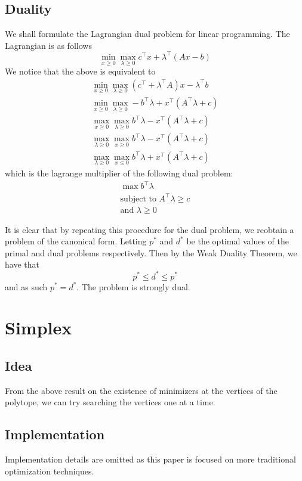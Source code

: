 \documentclass[letterpaper,twocolumn,12pt]{article}
\begin{document}
\subsection{Duality}
We shall formulate the Lagrangian dual problem for linear programming. The Lagrangian is
as follows
$$\min_{x\geq 0}\max_{\lambda\geq 0} c^\intercal x+\lambda^\intercal(Ax-b)$$
We notice that the above is equivalent to
\begin{align*}
  \min_{x\geq 0}\max_{\lambda\geq 0} (c^\intercal+\lambda^\intercal A)x-\lambda^\intercal b\\
  \min_{x\geq 0}\max_{\lambda\geq 0} -b^\intercal\lambda+x^\intercal(A^\intercal\lambda+c)\\
  \max_{x\geq 0}\max_{\lambda\geq 0} b^\intercal\lambda-x^\intercal(A^\intercal\lambda+c)\\
  \max_{\lambda\geq 0}\max_{x\geq 0} b^\intercal\lambda-x^\intercal(A^\intercal\lambda+c)\\
  \max_{\lambda\geq 0}\max_{x\leq 0} b^\intercal\lambda+x^\intercal(A^\intercal\lambda+c)
\end{align*}
which is the lagrange multiplier of the following dual problem:
\begin{align*}
  \max b^\intercal\lambda\\
  \text{subject to } A^\intercal\lambda\geq c\\
  \text{and } \lambda\geq 0
\end{align*}

It is clear that by repeating this procedure for the dual problem, we reobtain a problem
of the canonical form. Letting $p^*$ and $d^*$ be the optimal values of the primal and
dual problems respectively. Then by the Weak Duality Theorem, we have that
$$p^*\leq d^*\leq p^*$$
and as such $p^*=d^*$. The problem is strongly dual.

\section{Simplex}
\subsection{Idea}
From the above result on the existence of minimizers at the vertices of the polytope, we
can try searching the vertices one at a time.

\subsection{Implementation}
Implementation details are omitted as this paper is focused on more traditional
optimization techniques.
\end{document}
